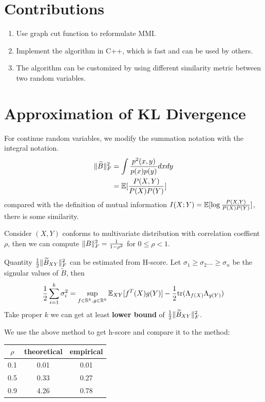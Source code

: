\documentclass{article}
\newif\ifpublish
\begin{document}
\section{Contributions}
\begin{enumerate}
\item Use graph cut function to reformulate MMI.
\item Implement the algorithm in C++, which is fast and can be used by others.
\item The algorithm can be customized by using different similarity metric between two random variables.
\end{enumerate}
\appendix
\section{Approximation of KL Divergence}\label{sec:akld}
\ifpublish

\fi
For continue random variables, we modify the summation notation with the integral notation.
\begin{align}
\lVert\widetilde{B}\rVert_F^2 & = \int \frac{p^2(x,y)}{p(x)p(y)} dx dy \\
& = \operatorname{\mathbb{E}}[\frac{P(X,Y)}{P(X)P(Y)}]
\end{align}
compared with the definition of mutual information $I(X;Y) =  \operatorname{\mathbb{E}}[\log \frac{P(X,Y)}{P(X)P(Y)}] $,
there is some similarity.

\begin{example}\label{ex:rho}
Consider $(X,Y)$ conforms to multivariate distribution with correlation coeffient $\rho$, then
we can compute $\lVert B\rVert_F^2 = \frac{1}{1-\rho^2}$ for $0\leq \rho < 1 $.
\end{example}


Quantity ${1 \over 2} \lVert\widetilde{B}_{XY}\rVert_F^2$ can be estimated from H-score.
Let $\sigma_1 \geq \sigma_2 \dots \geq \sigma_n$ be the signular values of  $\widetilde{B}$,
then
\begin{equation}
{1 \over 2} \sum_{i=1}^k \sigma_i^2  = \displaystyle\sup_{f\in \mathbb{R}^k, g \in \mathbb{R}^k} \operatorname{\mathbb{E}}_{XY}[f^T(X)g(Y)]- {1 \over 2} \mathrm{tr}(\Lambda_{f(X)} \Lambda_{g(Y)})
\end{equation}
Take proper $k$ we can get at least \textbf{lower bound} of ${1 \over 2} \lVert\widetilde{B}_{XY}\rVert_F^2$.

We use the above method to get h-score and compare it to the method:

\begin{table}[!ht]
\centering
\begin{tabular}{ccc}
\hline
$\rho$ & theoretical & empirical \\
\hline
0.1 & 0.01 & 0.01 \\
0.5 & 0.33 & 0.27 \\
0.9 & 4.26 & 0.78 \\
\hline
\end{tabular}
\end{table}
\end{document}
